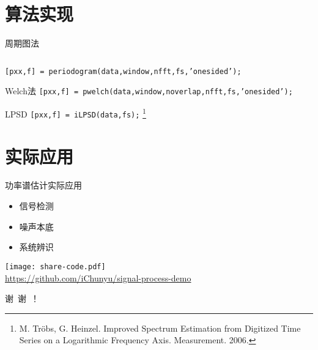 \documentclass{beamer}
\begin{document}
\section{算法实现}
\begin{frame}{周期图法}
    \begin{columns}
        \begin{column}{0.6\textwidth}
            
        \end{column}
        \begin{column}{0.6\textwidth}
            
        \end{column}
    \end{columns}
    \small
    \texttt{[pxx,f] = periodogram(data,window,nfft,fs,'onesided');}
\end{frame}

\begin{frame}{Welch法}
    \small
    \texttt{[pxx,f] = pwelch(data,window,noverlap,nfft,fs,'onesided');}
\end{frame}

\begin{frame}{LPSD}
    \small
    \texttt{[pxx,f] = iLPSD(data,fs);}
    \footnote{M. Tröbs, G. Heinzel. Improved Spectrum Estimation from Digitized Time Series on a Logarithmic Frequency Axis. Measurement. 2006.
    }
\end{frame}


\section{实际应用}
\begin{frame}{功率谱估计实际应用}
    \begin{itemize}
        \item 信号检测
        \item 噪声本底
        \item 系统辨识
    \end{itemize}
    
    \hfill\texttt{[image: share-code.pdf]} \\
    \hfill\href{https://github.com/iChunyu/signal-process-demo}{\scriptsize https://github.com/iChunyu/signal-process-demo}
    
\end{frame}

\begin{frame}[standout]
     谢\ 谢\ ！
\end{frame}
\end{document}
